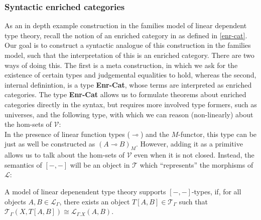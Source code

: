 \subsubsection{Syntactic enriched categories}
As an in depth example construction in the families model of linear dependent type theory, recall the notion of an enriched category in as defined in \ref{enr-cat}.
Our goal is to construct a syntactic analogue of this construction in the families model, such that the interpretation of this is an enriched category. There are two ways of doing this. The first is a meta construction, in which we ask for the existence of certain types and judgemental equalities to hold, whereas the second, internal definintion, is a type \textbf{Enr-Cat}, whose terms are interpreted as enriched categories. The type \textbf{Enr-Cat} allows us to formulate theorems about enriched categories directly in the syntax, but requires more involved type formers, such as universes, and the following type,
with which we can reason (non-linearly) about the hom-sets of $\mathcal{V}$:\\
In the presence of linear function types ($\multimap$) and the $M$-functor, this type can be just as well be constructed as $(A \multimap B)_M$. However, adding it as a primitive allows us to talk about the hom-sets of $\mathcal{V}$ even when it is not closed. Instead, the semantics of $[-, -]$ will be an object in $\mathcal{T}$ which ``represents'' the morphisms of $\mathcal{L}$:
\begin{defn}
  A model of linear depenendent type theory supports $[-,-]$-types, if, for all objects $A, B \in \mathcal{L}_{\Gamma}$, there exists an object $T[A, B] \in \mathcal{T}_{\Gamma}$ such that $\mathcal{T}_{\Gamma}(X, T[A, B]) \cong \mathcal{L}_{\Gamma.X}(A, B)$.
\end{defn}

